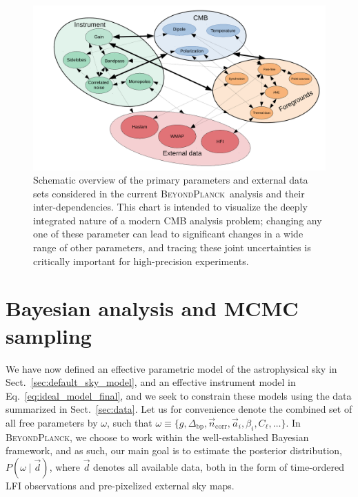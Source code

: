 \documentclass[onecolumn]{aa}
\renewcommand{\d}[0]{\vec{d}}
\newcommand{\n}[0]{\vec{n}}
\renewcommand{\a}[0]{\vec{a}}
\newcommand{\Dbp}[0]{\Delta_{\mathrm{bp}}}
\newcommand{\BP}{\textsc{BeyondPlanck}}
\begin{document}
\begin{figure}[t]
	\center
	\includegraphics[width=0.8\linewidth]{figs/BP_param_dependencies.pdf}
	\caption{Schematic overview of the primary parameters and
          external data sets considered in the current \BP\ analysis
          and their inter-dependencies. This chart is intended to
          visualize the deeply integrated nature of a modern CMB
          analysis problem; changing any one of these parameter can
          lead to significant changes in a wide range of other
          parameters, and tracing these joint uncertainties is
          critically important for high-precision experiments. }
	\label{fig:dependencies}
\end{figure}

\section{Bayesian analysis and MCMC sampling}

We have now defined an effective parametric model of the astrophysical
sky in Sect.~\ref{sec:default_sky_model}, and an effective instrument
model in Eq.~\eqref{eq:ideal_model_final}, and we seek to constrain
these models using the data summarized in Sect.~\ref{sec:data}. Let us
for convenience denote the combined set of all free parameters by
$\omega$, such that $\omega\equiv\{g,\Dbp,\n_{\mathrm{corr}}, \a_i,
\beta_i, C_{\ell},\ldots\}$. In \BP, we choose to work within the
well-established Bayesian framework, and as such, our main goal is to
estimate the posterior distribution, $P(\omega\mid \d)$, where $\d$
denotes all available data, both in the form of time-ordered LFI
observations and pre-pixelized external sky maps.
\end{document}
